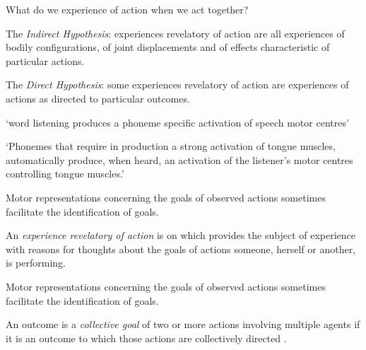 \documentclass[12pt]{extarticle}
\date{}
\begin{document}
\begin{multicols*}{3}

\setlength\footnotesep{1em}











What do we experience of action when we act together?

The \emph{Indirect Hypothesis}: experiences revelatory of action are all experiences of bodily
configurations, of joint displacements and of effects characteristic of particular actions.

The \emph{Direct Hypothesis}: some experiences revelatory of action are experiences of actions as
directed to particular outcomes.

‘word listening produces a phoneme specific activation of speech motor centres’ \citep{Fadiga:2002kl}



‘Phonemes that require in production a strong activation of tongue muscles, automatically produce, when heard, an activation of the listener's motor centres controlling tongue muscles.’ \citep{Fadiga:2002kl}


Motor representations concerning the goals of observed actions sometimes facilitate the identification of goals.

An \emph{experience revelatory of action} is on
which provides the subject of experience with reasons for thoughts about the
goals of actions someone, herself or another, is performing.

Motor representations concerning the goals of observed actions sometimes facilitate the identification of goals.

An outcome is a \emph{collective goal} of two or more actions involving multiple
agents if it is an outcome to which those actions are collectively directed \citep{butterfill:2016_minimal}.


    



\footnotesize


\end{multicols*}
\end{document}
